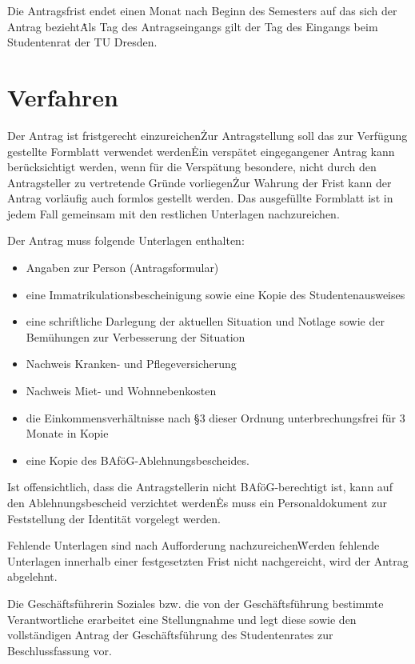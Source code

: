 \begin{multicols}{2}
\Abs \Satz Die Antragsfrist endet einen Monat nach Beginn des Semesters auf das sich der Antrag bezieht\. Als Tag des Antragseingangs gilt der Tag des Eingangs beim Studentenrat der TU Dresden.


\section{Verfahren}
\Abs \Satz Der Antrag ist fristgerecht einzureichen\. Zur Antragstellung soll das zur Verfügung gestellte Formblatt verwendet werden\. Ein verspätet eingegangener Antrag kann berücksichtigt werden, wenn für die Verspätung besondere, nicht durch den Antragsteller zu vertretende Gründe vorliegen\. Zur Wahrung der Frist kann der Antrag vorläufig auch formlos gestellt werden. Das ausgefüllte Formblatt ist in jedem Fall gemeinsam mit den restlichen Unterlagen nachzureichen.

\Abs \Satz Der Antrag muss folgende Unterlagen enthalten: 
\begin{itemize}
\item Angaben zur Person (Antragsformular) 
\item eine Immatrikulationsbescheinigung sowie eine Kopie des Studentenausweises
\item eine schriftliche Darlegung der aktuellen Situation und Notlage sowie der Bemühungen zur Verbesserung der Situation
\item Nachweis Kranken- und Pflegeversicherung
\item Nachweis Miet- und Wohnnebenkosten
\item die Einkommensverhältnisse nach §3 dieser Ordnung unterbrechungsfrei für 3 Monate in Kopie
\item eine Kopie des BAföG-Ablehnungsbescheides. 
\end{itemize}
\Satz Ist offensichtlich, dass die Antragstellerin nicht BAföG-berechtigt ist, kann auf den Ablehnungsbescheid verzichtet werden\. Es muss ein Personaldokument zur Feststellung der Identität vorgelegt werden.

\Abs \Satz Fehlende Unterlagen sind nach Aufforderung nachzureichen\. Werden fehlende Unterlagen innerhalb einer festgesetzten Frist nicht nachgereicht, wird der Antrag abgelehnt.

\Abs \Satz Die Geschäftsführerin Soziales bzw. die von der Geschäftsführung bestimmte Verantwortliche erarbeitet eine Stellungnahme und legt diese sowie den vollständigen Antrag der Geschäftsführung des Studentenrates zur Beschlussfassung vor.



\end{multicols}
